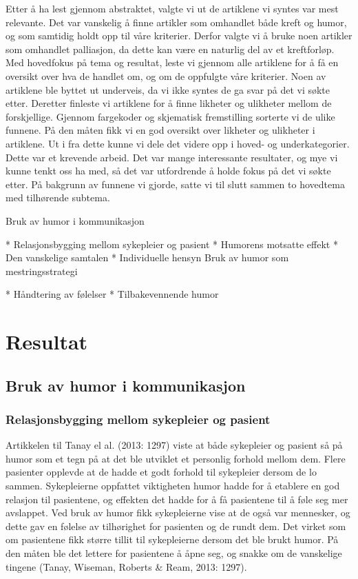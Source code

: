 Etter å ha lest gjennom abstraktet, valgte vi ut de artiklene vi syntes var
mest relevante. Det var vanskelig å finne artikler som omhandlet både kreft og
humor, og som samtidig holdt opp til våre kriterier. Derfor valgte vi å bruke
noen artikler som omhandlet palliasjon, da dette kan være en naturlig del av et
kreftforløp. Med hovedfokus på tema og resultat, leste vi gjennom alle
artiklene for å få en oversikt over hva de handlet om, og om de oppfulgte våre
kriterier. Noen av artiklene ble byttet ut underveis, da vi ikke syntes de ga
svar på det vi søkte etter. Deretter finleste vi artiklene for å finne likheter
og ulikheter mellom de forskjellige. Gjennom fargekoder og skjematisk
fremstilling sorterte vi de ulike funnene. På den måten fikk vi en god oversikt
over likheter og ulikheter i artiklene. Ut i fra dette kunne vi dele det videre
opp i hoved- og underkategorier. Dette var et krevende arbeid. Det var mange
interessante resultater, og mye vi kunne tenkt oss ha med, så det var
utfordrende å holde fokus på det vi søkte etter. På bakgrunn av funnene vi
gjorde, satte vi til slutt sammen to hovedtema med tilhørende  subtema.

Bruk av humor i kommunikasjon

	* Relasjonsbygging mellom sykepleier og pasient
* Humorens motsatte effekt
* Den vanskelige samtalen
* Individuelle hensyn
	Bruk av humor som mestringsstrategi

	*  Håndtering av følelser
*  Tilbakevennende humor


\chapter{Resultat}

\section{Bruk av humor i kommunikasjon}

\subsection{Relasjonsbygging mellom sykepleier og pasient}

Artikkelen til Tanay el al. (2013: 1297) viste at både sykepleier og pasient så
på humor som et tegn på at det ble utviklet et personlig forhold mellom dem.
Flere pasienter opplevde at de hadde et godt forhold til sykepleier dersom de
lo sammen. Sykepleierne oppfattet viktigheten humor hadde for å etablere en god
relasjon til pasientene, og effekten det hadde for å få pasientene til å føle
seg mer avslappet. Ved bruk av humor fikk sykepleierne vise at de også var
mennesker, og dette gav en følelse av tilhørighet for pasienten og de rundt
dem. Det virket som om pasientene fikk større tillit til sykepleierne dersom
det ble brukt humor. På den måten ble det lettere for pasientene å åpne seg, og
snakke om de vanskelige tingene (Tanay, Wiseman, Roberts \&{} Ream, 2013: 1297).

